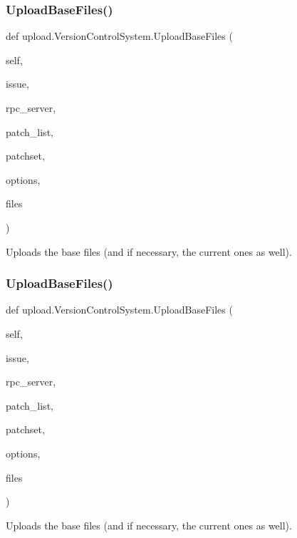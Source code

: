\subsubsection{\texorpdfstring{UploadBaseFiles()}{UploadBaseFiles()}\hspace{0.1cm}{\footnotesize\ttfamily [1/2]}}
{\footnotesize\ttfamily def upload.\+Version\+Control\+System.\+Upload\+Base\+Files (\begin{DoxyParamCaption}\item[{}]{self,  }\item[{}]{issue,  }\item[{}]{rpc\+\_\+server,  }\item[{}]{patch\+\_\+list,  }\item[{}]{patchset,  }\item[{}]{options,  }\item[{}]{files }\end{DoxyParamCaption})}

\begin{DoxyVerb}Uploads the base files (and if necessary, the current ones as well).\end{DoxyVerb}
 \mbox{\label{classupload_1_1VersionControlSystem_a7e334f967301b9e85e5a9c39f5036823}} 
\subsubsection{\texorpdfstring{UploadBaseFiles()}{UploadBaseFiles()}\hspace{0.1cm}{\footnotesize\ttfamily [2/2]}}
{\footnotesize\ttfamily def upload.\+Version\+Control\+System.\+Upload\+Base\+Files (\begin{DoxyParamCaption}\item[{}]{self,  }\item[{}]{issue,  }\item[{}]{rpc\+\_\+server,  }\item[{}]{patch\+\_\+list,  }\item[{}]{patchset,  }\item[{}]{options,  }\item[{}]{files }\end{DoxyParamCaption})}

\begin{DoxyVerb}Uploads the base files (and if necessary, the current ones as well).\end{DoxyVerb}
 

